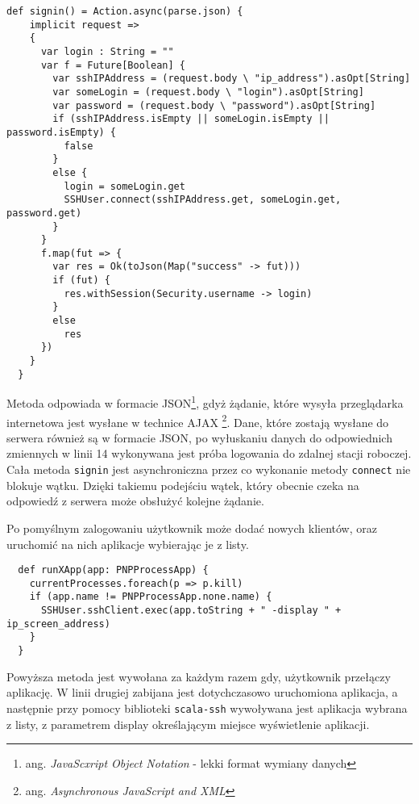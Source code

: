 \begin{lstlisting}
def signin() = Action.async(parse.json) {
    implicit request =>
    {
      var login : String = ""
      var f = Future[Boolean] {
        var sshIPAddress = (request.body \ "ip_address").asOpt[String]
        var someLogin = (request.body \ "login").asOpt[String]
        var password = (request.body \ "password").asOpt[String]
        if (sshIPAddress.isEmpty || someLogin.isEmpty || password.isEmpty) {
          false
        }
        else {
          login = someLogin.get
          SSHUser.connect(sshIPAddress.get, someLogin.get, password.get)
        }
      }
      f.map(fut => {
        var res = Ok(toJson(Map("success" -> fut)))
        if (fut) {
          res.withSession(Security.username -> login)
        }
        else
          res
      })
    }
  }
\end{lstlisting}

Metoda odpowiada w formacie JSON\footnote{ang. \emph{JavaScxript Object Notation} - lekki format wymiany danych}, gdyż żądanie, które wysyła przeglądarka internetowa jest wysłane w technice AJAX \footnote{ang. \emph{Asynchronous JavaScript and XML}}. Dane, które zostają wysłane do serwera również są w formacie JSON, po wyłuskaniu danych do odpowiednich zmiennych w linii 14 wykonywana jest próba logowania do zdalnej stacji roboczej. Cała metoda \lstinline{signin} jest asynchroniczna przez co wykonanie metody \lstinline{connect} nie blokuje wątku. Dzięki takiemu podejściu wątek, który obecnie czeka na odpowiedź z serwera może obsłużyć kolejne żądanie.

\par

Po pomyślnym zalogowaniu użytkownik może dodać nowych klientów, oraz uruchomić na nich aplikacje wybierając je z listy.

\begin{lstlisting}
  def runXApp(app: PNPProcessApp) {
    currentProcesses.foreach(p => p.kill)
    if (app.name != PNPProcessApp.none.name) {
      SSHUser.sshClient.exec(app.toString + " -display " + ip_screen_address)
    }
  }
\end{lstlisting}

Powyższa metoda jest wywołana za każdym razem gdy, użytkownik przełączy aplikację. W linii drugiej zabijana jest dotychczasowo uruchomiona aplikacja, a następnie przy pomocy biblioteki \lstinline{scala-ssh} wywoływana jest aplikacja wybrana z listy, z parametrem display określającym miejsce wyświetlenie aplikacji.



